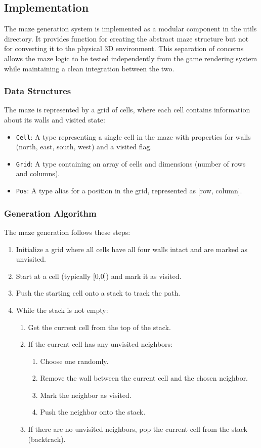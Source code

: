 \documentclass{article}
\begin{document}
\subsection{Implementation}

The maze generation system is implemented as a modular component in the utils directory. It provides function for creating the abstract maze structure but not for converting it to the physical 3D environment. This separation of concerns allows the maze logic to be tested independently from the game rendering system while maintaining a clean integration between the two.

\subsubsection{Data Structures}
The maze is represented by a grid of cells, where each cell contains information about its walls and visited state:
\begin{itemize}
    \item \texttt{Cell}: A type representing a single cell in the maze with properties for walls (north, east, south, west) and a visited flag.
    \item \texttt{Grid}: A type containing an array of cells and dimensions (number of rows and columns).
    \item \texttt{Pos}: A type alias for a position in the grid, represented as [row, column].
\end{itemize}

\subsubsection{Generation Algorithm}
The maze generation follows these steps:
\begin{enumerate}
    \item Initialize a grid where all cells have all four walls intact and are marked as unvisited.
    \item Start at a cell (typically [0,0]) and mark it as visited.
    \item Push the starting cell onto a stack to track the path.
    \item While the stack is not empty:
    \begin{enumerate}
        \item Get the current cell from the top of the stack.
        \item If the current cell has any unvisited neighbors:
        \begin{enumerate}
            \item Choose one randomly.
            \item Remove the wall between the current cell and the chosen neighbor.
            \item Mark the neighbor as visited.
            \item Push the neighbor onto the stack.
        \end{enumerate}
        \item If there are no unvisited neighbors, pop the current cell from the stack (backtrack).
    \end{enumerate}
\end{enumerate}
\end{document}
